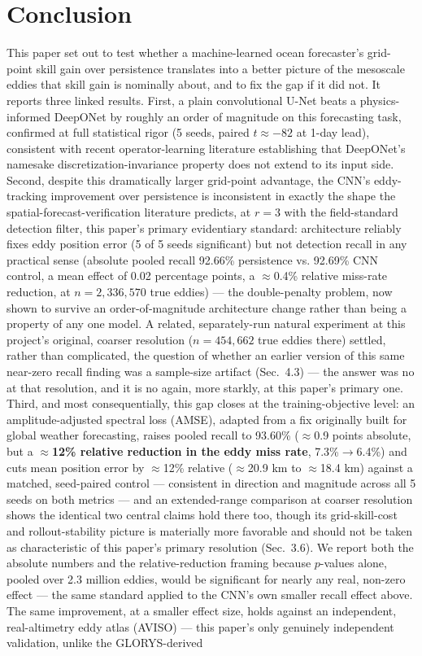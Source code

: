 \documentclass[11pt]{article}
\begin{document}
\section{Conclusion}

This paper set out to test whether a machine-learned ocean forecaster's grid-point skill gain over persistence translates into a better picture of the mesoscale eddies that skill gain is nominally about, and to fix the gap if it did not. It reports three linked results. First, a plain convolutional U-Net beats a physics-informed DeepONet by roughly an order of magnitude on this forecasting task, confirmed at full statistical rigor (5 seeds, paired $t\approx-82$ at 1-day lead), consistent with recent operator-learning literature establishing that DeepONet's namesake discretization-invariance property does not extend to its input side. Second, despite this dramatically larger grid-point advantage, the CNN's eddy-tracking improvement over persistence is inconsistent in exactly the shape the spatial-forecast-verification literature predicts, at $r=3$ with the field-standard detection filter, this paper's primary evidentiary standard: architecture reliably fixes eddy position error (5 of 5 seeds significant) but not detection recall in any practical sense (absolute pooled recall 92.66\% persistence vs. 92.69\% CNN control, a mean effect of 0.02 percentage points, a $\approx$0.4\% relative miss-rate reduction, at $n=2{,}336{,}570$ true eddies) --- the double-penalty problem, now shown to survive an order-of-magnitude architecture change rather than being a property of any one model. A related, separately-run natural experiment at this project's original, coarser resolution ($n=454{,}662$ true eddies there) settled, rather than complicated, the question of whether an earlier version of this same near-zero recall finding was a sample-size artifact (Sec.~4.3) --- the answer was no at that resolution, and it is no again, more starkly, at this paper's primary one. Third, and most consequentially, this gap closes at the training-objective level: an amplitude-adjusted spectral loss (AMSE), adapted from a fix originally built for global weather forecasting, raises pooled recall to 93.60\% ($\approx$0.9 points absolute, but a \textbf{$\approx$12\% relative reduction in the eddy miss rate}, 7.3\%$\to$6.4\%) and cuts mean position error by $\approx$12\% relative ($\approx$20.9 km to $\approx$18.4 km) against a matched, seed-paired control --- consistent in direction and magnitude across all 5 seeds on both metrics --- and an extended-range comparison at coarser resolution shows the identical two central claims hold there too, though its grid-skill-cost and rollout-stability picture is materially more favorable and should not be taken as characteristic of this paper's primary resolution (Sec.~3.6). We report both the absolute numbers and the relative-reduction framing because $p$-values alone, pooled over 2.3 million eddies, would be significant for nearly any real, non-zero effect --- the same standard applied to the CNN's own smaller recall effect above. The same improvement, at a smaller effect size, holds against an independent, real-altimetry eddy atlas (AVISO) --- this paper's only genuinely independent validation, unlike the GLORYS-derived 
\end{document}
